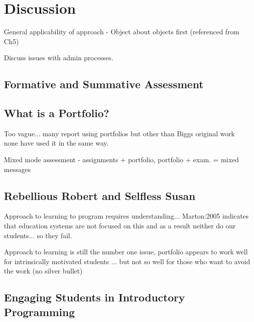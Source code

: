 
\chapter{Discussion} %
\label{cha:discussion}


General applicability of approach - Object about objects first (referenced from Ch5)

Discuss issues with admin processes.



\section{Formative and Summative Assessment} %
\label{sec:formative_and_summative_assessment}


\section{What is a Portfolio?} %
\label{sec:what_is_a_portfolio_}

Too vague... many report using portfolios but other than Biggs original work none have used it in the same way.


Mixed mode assessment - assignments + portfolio, portfolio + exam.
= mixed messages


\section{Rebellious Robert and Selfless Susan} %
\label{sec:rebellious_robert_and_selfless_susan}

Approach to learning to program requires understanding... Marton:2005 indicates that education systems are not focused on this and as a result neither do our students... so they fail.

Approach to learning is still the number one issue, portfolio appears to work well for intrinsically motivated students ... but not so well for those who want to avoid the work (no silver bullet)


\section{Engaging Students in Introductory Programming} %
\label{sec:engaging_students_in_introductory_programming}


